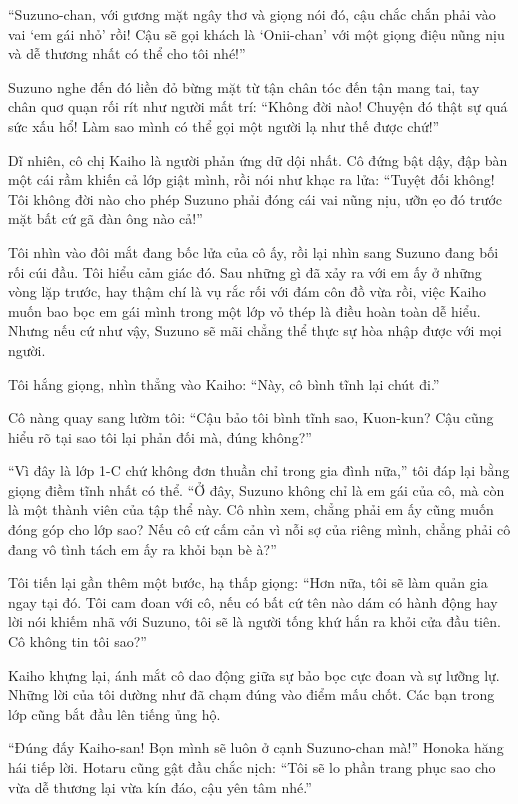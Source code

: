 \documentclass[../main.tex]{subfiles}
\begin{document}
``Suzuno-chan, với gương mặt ngây thơ và giọng nói đó, cậu chắc chắn phải vào vai `em gái nhỏ' rồi! Cậu sẽ gọi khách là `Onii-chan' với một giọng điệu nũng nịu và dễ thương nhất có thể cho tôi nhé!''

Suzuno nghe đến đó liền đỏ bừng mặt từ tận chân tóc đến tận mang tai, tay chân quơ quạn rối rít như người mất trí: ``Không đời nào! Chuyện đó thật sự quá sức xấu hổ! Làm sao mình có thể gọi một người lạ như thế được chứ!''

Dĩ nhiên, cô chị Kaiho là người phản ứng dữ dội nhất. Cô đứng bật dậy, đập bàn một cái rầm khiến cả lớp giật mình, rồi nói như khạc ra lửa: ``Tuyệt đối không! Tôi không đời nào cho phép Suzuno phải đóng cái vai nũng nịu, ưỡn ẹo đó trước mặt bất cứ gã đàn ông nào cả!''

Tôi nhìn vào đôi mắt đang bốc lửa của cô ấy, rồi lại nhìn sang Suzuno đang bối rối cúi đầu. Tôi hiểu cảm giác đó. Sau những gì đã xảy ra với em ấy ở những vòng lặp trước, hay thậm chí là vụ rắc rối với đám côn đồ vừa rồi, việc Kaiho muốn bao bọc em gái mình trong một lớp vỏ thép là điều hoàn toàn dễ hiểu. Nhưng nếu cứ như vậy, Suzuno sẽ mãi chẳng thể thực sự hòa nhập được với mọi người.

Tôi hắng giọng, nhìn thẳng vào Kaiho: ``Này, cô bình tĩnh lại chút đi.''

Cô nàng quay sang lườm tôi: ``Cậu bảo tôi bình tĩnh sao, Kuon-kun? Cậu cũng hiểu rõ tại sao tôi lại phản đối mà, đúng không?''

``Vì đây là lớp 1-C chứ không đơn thuần chỉ trong gia đình nữa,'' tôi đáp lại bằng giọng điềm tĩnh nhất có thể. ``Ở đây, Suzuno không chỉ là em gái của cô, mà còn là một thành viên của tập thể này. Cô nhìn xem, chẳng phải em ấy cũng muốn đóng góp cho lớp sao? Nếu cô cứ cấm cản vì nỗi sợ của riêng mình, chẳng phải cô đang vô tình tách em ấy ra khỏi bạn bè à?''

Tôi tiến lại gần thêm một bước, hạ thấp giọng: ``Hơn nữa, tôi sẽ làm quản gia ngay tại đó. Tôi cam đoan với cô, nếu có bất cứ tên nào dám có hành động hay lời nói khiếm nhã với Suzuno, tôi sẽ là người tống khứ hắn ra khỏi cửa đầu tiên. Cô không tin tôi sao?''

Kaiho khựng lại, ánh mắt cô dao động giữa sự bảo bọc cực đoan và sự lưỡng lự. Những lời của tôi dường như đã chạm đúng vào điểm mấu chốt. Các bạn trong lớp cũng bắt đầu lên tiếng ủng hộ.

``Đúng đấy Kaiho-san! Bọn mình sẽ luôn ở cạnh Suzuno-chan mà!'' Honoka hăng hái tiếp lời. Hotaru cũng gật đầu chắc nịch: ``Tôi sẽ lo phần trang phục sao cho vừa dễ thương lại vừa kín đáo, cậu yên tâm nhé.''
\end{document}
